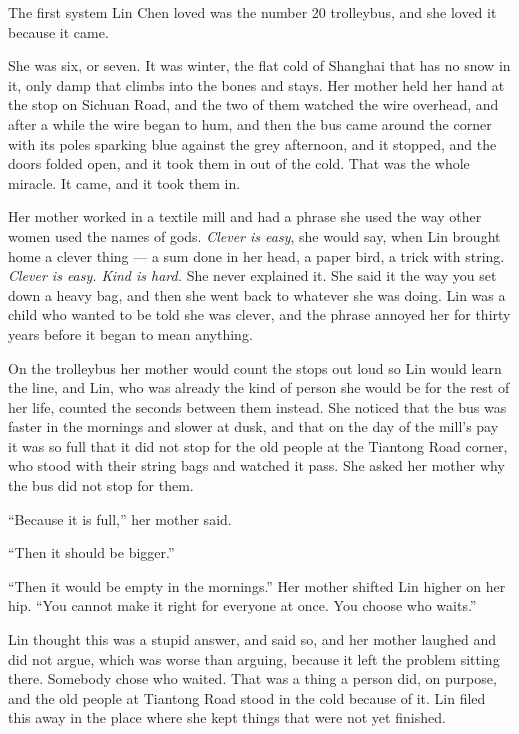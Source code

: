 The first system Lin Chen loved was the number 20 trolleybus, and she loved it because it came.

She was six, or seven. It was winter, the flat cold of Shanghai that has no snow in it, only damp that climbs into the bones and stays. Her mother held her hand at the stop on Sichuan Road, and the two of them watched the wire overhead, and after a while the wire began to hum, and then the bus came around the corner with its poles sparking blue against the grey afternoon, and it stopped, and the doors folded open, and it took them in out of the cold. That was the whole miracle. It came, and it took them in.

Her mother worked in a textile mill and had a phrase she used the way other women used the names of gods. \emph{Clever is easy}, she would say, when Lin brought home a clever thing --- a sum done in her head, a paper bird, a trick with string. \emph{Clever is easy. Kind is hard.} She never explained it. She said it the way you set down a heavy bag, and then she went back to whatever she was doing. Lin was a child who wanted to be told she was clever, and the phrase annoyed her for thirty years before it began to mean anything.

On the trolleybus her mother would count the stops out loud so Lin would learn the line, and Lin, who was already the kind of person she would be for the rest of her life, counted the seconds between them instead. She noticed that the bus was faster in the mornings and slower at dusk, and that on the day of the mill's pay it was so full that it did not stop for the old people at the Tiantong Road corner, who stood with their string bags and watched it pass. She asked her mother why the bus did not stop for them.

``Because it is full,'' her mother said.

``Then it should be bigger.''

``Then it would be empty in the mornings.'' Her mother shifted Lin higher on her hip. ``You cannot make it right for everyone at once. You choose who waits.''

Lin thought this was a stupid answer, and said so, and her mother laughed and did not argue, which was worse than arguing, because it left the problem sitting there. Somebody chose who waited. That was a thing a person did, on purpose, and the old people at Tiantong Road stood in the cold because of it. Lin filed this away in the place where she kept things that were not yet finished.

